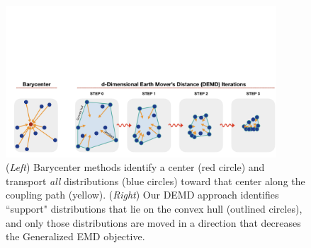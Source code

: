 \begin{figure}
    \centering
    \includegraphics[trim={2cm, 0, 0, 18cm},clip,width=0.9\textwidth]{6_demd/figs/demd_hull_v3.png}
    \caption[Visualizing steps withing the d-MMOT minimization]{({\em Left}) Barycenter methods identify a center (red circle) and transport \textit{all} distributions (blue circles) toward that center along the coupling path (yellow). ({\em Right}) Our DEMD approach identifies ``support" distributions that lie on the convex hull (outlined circles),  and only those distributions are moved in a direction that decreases the Generalized EMD objective.}
    \label{fig:min_demd}
\end{figure}




